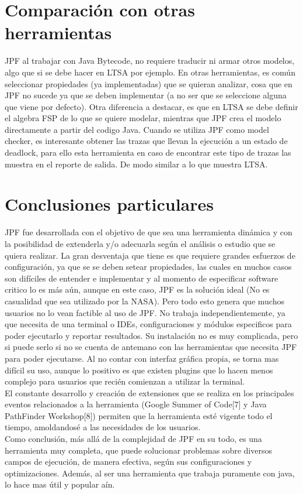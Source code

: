 \documentclass[runningheads]{llncs}
\begin{document}
\section{Comparaci\'on con otras herramientas}

JPF al trabajar con Java Bytecode, no requiere traducir ni armar otros modelos, algo que si se debe hacer en LTSA por ejemplo. En otras herramientas, es com\'un seleccionar propiedades (ya implementadas) que se quieran analizar, cosa que en JPF no sucede ya que se deben implementar (a no ser que se seleccione alguna que viene por defecto).
Otra diferencia a destacar, es que en LTSA se debe definir el algebra FSP de lo que se quiere modelar, mientras que JPF crea el modelo directamente a partir del codigo Java.
Cuando se utiliza JPF como model checker, es interesante obtener las trazas que llevan la ejecuci\'on a un estado de deadlock, para ello esta herramienta en caso de encontrar este tipo de trazas las muestra en el reporte de salida. De modo similar a lo que muestra LTSA.


\section{Conclusiones particulares}

JPF fue desarrollada con el objetivo de que sea una herramienta din\'amica y con la posibilidad de extenderla y/o adecuarla seg\'un el an\'alisis o estudio que se quiera realizar. La gran desventaja que tiene es que requiere grandes esfuerzos de configuraci\'on, ya que se se deben setear propiedades, las cuales en muchos casos son dif\'iciles de entender e implementar y al momento de especificar software critico lo es m\'as a\'un, aunque en este caso, JPF es la soluci\'on ideal (No es casualidad que sea utilizado por la NASA). Pero todo esto genera que muchos usuarios no lo vean factible al uso de JPF.
No trabaja independientemente, ya que necesita de una terminal o IDEs, configuraciones y m\'odulos especificos para poder ejecutarlo y reportar resultados. Su instalaci\'on no es muy complicada, pero si puede serlo si no se cuenta de antemano con las herramientas que necesita JPF para poder ejecutarse. Al no contar con interfaz gr\'afica propia, se torna mas dif\'icil su uso, aunque lo positivo es que existen plugins que lo hacen menos complejo para usuarios que reci\'en comienzan a utilizar la terminal.\\
El constante desarrollo y creaci\'on de extensiones que se realiza en los principales eventos relacionados a la herramienta (Google Summer of Code[7] y Java PathFinder Workshop[8]) permiten que la herramienta est\'e vigente todo el tiempo, amoldandos\'e a las necesidades de los usuarios.\\
Como conclusi\'on, m\'as all\'a de la complejidad de JPF en su todo, es una herramienta muy completa, que puede solucionar problemas sobre diversos campos de ejecuci\'on, de manera efectiva, seg\'un sus configuraciones y optimizaciones. Adem\'as, al ser una herramienta que trabaja puramente con java, lo hace mas \'util y popular a\'in.
\end{document}
